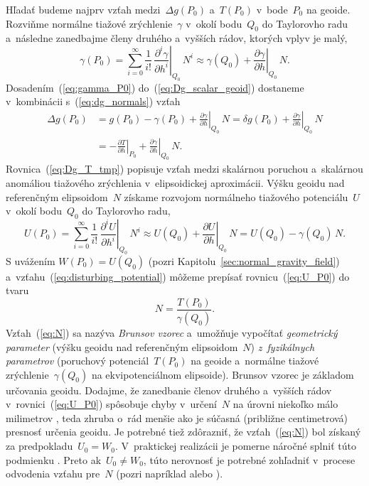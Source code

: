 \documentclass[a4paper, 12pt]{book}
\begin{document}
Hľadať budeme najprv vzťah medzi~$\Delta g(P_0)$ a~$T(P_0)$ v~bode~$P_0$ na 
geoide.  Rozviňme normálne tiažové zrýchlenie~$\gamma$ v~okolí bodu~$Q_0$ do 
Taylorovho radu a~následne zanedbajme členy druhého a~vyšších rádov, ktorých 
vplyv je malý,
%
\begin{equation}
\label{eq:gamma_P0}
\gamma(P_0) = \sum_{i = 0}^\infty \frac{1}{i!} \, \left.\frac{\partial^i 
\gamma}{\partial h^i}\right|_{Q_0} \, N^i \approx \gamma(Q_0) 
+ \left.\frac{\partial \gamma}{\partial h}\right|_{Q_0} \, N{.}
\end{equation}
%
Dosadením~(\ref{eq:gamma_P0}) do~(\ref{eq:Dg_scalar_geoid}) dostaneme 
v~kombinácii s~(\ref{eq:dg_normals}) vzťah
%
\begin{equation}
\label{eq:Dg_T_tmp}
\begin{split}
\Delta g(P_0) &= g(P_0) - \gamma(P_0) + \left.\frac{\partial \gamma}{\partial 
h}\right|_{Q_0} \, N = \delta g(P_0) + \left.\frac{\partial \gamma}{\partial 
h}\right|_{Q_0} \, N\\
%
&=-\left.\frac{\partial T}{\partial h}\right|_{P_0} + \left.\frac{\partial 
\gamma}{\partial h}\right|_{Q_0} \, N{.}
\end{split}
\end{equation}
%
Rovnica~(\ref{eq:Dg_T_tmp}) popisuje vzťah medzi skalárnou poruchou a~skalárnou 
anomáliou tiažového zrýchlenia v~elipsoidickej aproximácii.  Výšku geoidu nad 
referenčným elipsoidom~$N$ získame rozvojom normálneho tiažového potenciálu~$U$ 
v~okolí bodu~$Q_0$ do Taylorovho radu,
%
\begin{equation}
\label{eq:U_P0}
U(P_0) = \sum_{i = 0}^\infty \frac{1}{i!} \, \left.\frac{\partial^i U}{\partial 
h^i}\right|_{Q_0} \, N^i \approx U(Q_0) + \left.\frac{\partial U}{\partial 
h}\right|_{Q_0} \, N = U(Q_0) - \gamma(Q_0) \, N{.}
\end{equation}
%
S uvážením $W(P_0) = U(Q_0)$ (pozri Kapitolu~\ref{sec:normal_gravity_field}) 
a~vzťahu~(\ref{eq:disturbing_potential}) môžeme prepísať 
rovnicu~(\ref{eq:U_P0}) do tvaru
%
\begin{equation}
\label{eq:N}
N = \frac{T(P_0)}{\gamma(Q_0)}.
\end{equation}
%
Vzťah~(\ref{eq:N}) sa nazýva \emph{Brunsov vzorec} a~umožňuje vypočítať 
\emph{geometrický parameter} (výšku geoidu nad referenčným elipsoidom~$N$) 
\emph{z~fyzikálnych parametrov} (poruchový potenciál~$T(P_0)$ na geoide 
a~normálne tiažové zrýchlenie~$\gamma(Q_0)$ na ekvipotenciálnom elipsoide).  
Brunsov vzorec je základom určovania geoidu.  Dodajme, že zanedbanie členov 
druhého a~vyšších rádov v~rovnici~(\ref{eq:U_P0}) spôsobuje chyby v~určení~$N$ 
na úrovni niekoľko málo milimetrov \parencite{Jekeli2015,Sjoberg2017}, teda 
zhruba o~rád menšie ako je súčasná (približne centimetrová) presnosť určenia 
geoidu.  Je potrebné tiež zdôrazniť, že vzťah~(\ref{eq:N}) bol získaný za 
predpokladu~$U_0 = W_0$.  V~praktickej realizácii je pomerne náročné splniť 
túto podmienku \parencite{MoritzPhysicalGeodesy}.  Preto ak~$U_0 \neq W_0$, 
túto nerovnosť je potrebné zohľadniť v~procese odvodenia vzťahu pre~$N$ (pozri 
napríklad \cite{VanicekGeodesy} alebo \cite{MoritzPhysicalGeodesy}).
\end{document}

